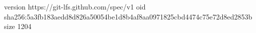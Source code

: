 version https://git-lfs.github.com/spec/v1
oid sha256:5a3fb183aedd8d826a50054be1d8b4af8aa0971825cbd4474c75e72d8ed2853b
size 1204
